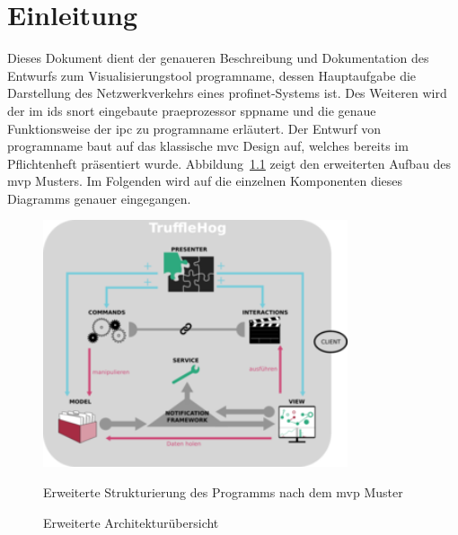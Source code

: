 \chapter{Einleitung}
Dieses Dokument dient der genaueren Beschreibung und Dokumentation des Entwurfs zum Visualisierungstool \gls{programname}, dessen Hauptaufgabe die Darstellung des Netzwerkverkehrs eines \gls{profinet}-Systems ist. Des Weiteren wird der im \gls{ids} \gls{snort} eingebaute \gls{praeprozessor} \gls{sppname} und die genaue Funktionsweise der \gls{ipc} zu \gls{programname} erläutert.\newline
 \newline
Der Entwurf von \gls{programname} baut auf das klassische \gls{mvc} Design auf, welches bereits im Pflichtenheft präsentiert wurde. Abbildung~\ref{fig:arch_diagram} zeigt den erweiterten Aufbau des \gls{mvp} Musters. Im Folgenden wird auf die einzelnen Komponenten dieses Diagramms genauer eingegangen.\newline
\begin{figure}[H]
  \centering
  \includegraphics[width=0.8\textwidth]{../diagramimages/arch_diagram_mvp_test.png}
  \caption[Erweiterte Architekturübersicht]{Erweiterte Architekturübersicht}
  \medskip
  Erweiterte Strukturierung des Programms nach dem \gls{mvp} Muster
  \label{fig:arch_diagram}
\end{figure}\newpage

